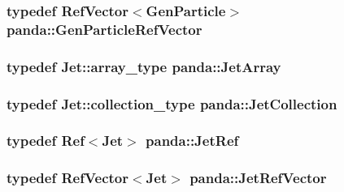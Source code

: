 \label{namespacepanda_ae0ab9f621218fc75452057f414235ffb}
\hypertarget{namespacepanda_a104343ab623686b03b2bc14bb25628a9}{
\subsubsection[{GenParticleRefVector}]{\setlength{\rightskip}{0pt plus 5cm}typedef {\bf RefVector}$<${\bf GenParticle}$>$ {\bf panda::GenParticleRefVector}}}
\label{namespacepanda_a104343ab623686b03b2bc14bb25628a9}
\hypertarget{namespacepanda_ad40d6bc31b82b5dbce3920e75adab89f}{
\subsubsection[{JetArray}]{\setlength{\rightskip}{0pt plus 5cm}typedef {\bf Jet::array\_\-type} {\bf panda::JetArray}}}
\label{namespacepanda_ad40d6bc31b82b5dbce3920e75adab89f}
\hypertarget{namespacepanda_a294a96c278d908b10e4f1489e3195477}{
\subsubsection[{JetCollection}]{\setlength{\rightskip}{0pt plus 5cm}typedef {\bf Jet::collection\_\-type} {\bf panda::JetCollection}}}
\label{namespacepanda_a294a96c278d908b10e4f1489e3195477}
\hypertarget{namespacepanda_a43eb57272d3c7308490209033e133e55}{
\subsubsection[{JetRef}]{\setlength{\rightskip}{0pt plus 5cm}typedef {\bf Ref}$<${\bf Jet}$>$ {\bf panda::JetRef}}}
\label{namespacepanda_a43eb57272d3c7308490209033e133e55}
\hypertarget{namespacepanda_a5ce2fe1f4e03ac599e364d18e4385878}{
\subsubsection[{JetRefVector}]{\setlength{\rightskip}{0pt plus 5cm}typedef {\bf RefVector}$<${\bf Jet}$>$ {\bf panda::JetRefVector}}}
\label{namespacepanda_a5ce2fe1f4e03ac599e364d18e4385878}
